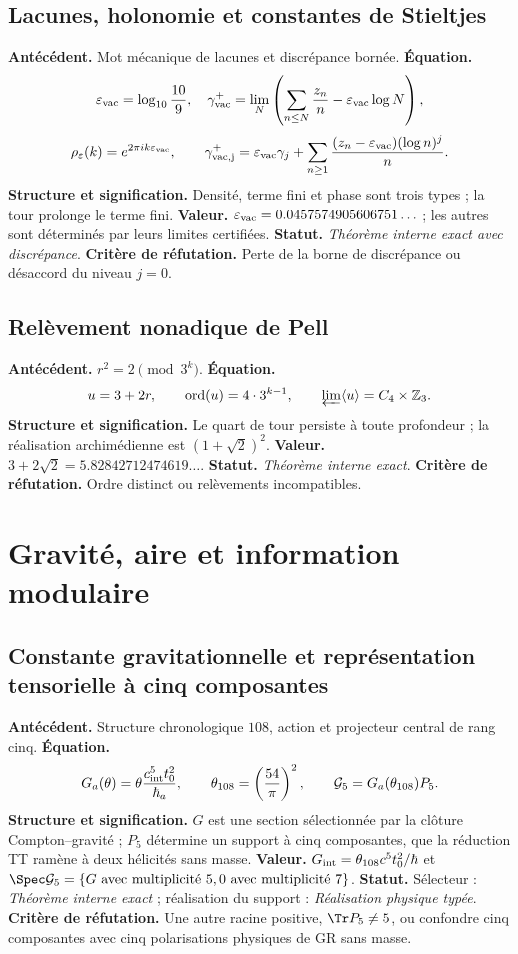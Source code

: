 \subsection*{Lacunes, holonomie et constantes de Stieltjes }
\textbf{Antécédent.} Mot mécanique de lacunes et discrépance bornée.
\textbf{Équation.}
\[
\varepsilon_{\rm vac}=\log_{10}\frac{10}{9},\quad
\gamma_{\rm vac}^+=\lim_N\left(\sum_{n\le N}\frac{z_n}{n}
-\varepsilon_{\rm vac}\log N\right),
\]
\[
\rho_\varepsilon(k)=e^{2\pi ik\varepsilon_{\rm vac}},\qquad
\gamma_{\rm vac,j}^+=\varepsilon_{\rm vac}\gamma_j+
\sum_{n\ge1}\frac{(z_n-\varepsilon_{\rm vac})(\log n)^j}{n}.
\]
\textbf{Structure et signification.} Densité, terme fini et phase sont trois
types ; la tour prolonge le terme fini. \textbf{Valeur.}
\(\varepsilon_{\rm vac}=0.0457574905606751\ldots\) ; les autres sont déterminés
par leurs limites certifiées. \textbf{Statut.} \emph{Théorème interne exact avec
discrépance}. \textbf{Critère de réfutation.} Perte de la borne de discrépance ou
désaccord du niveau \(j=0\).

\subsection*{Relèvement nonadique de Pell }
\textbf{Antécédent.} \(r^2=2\pmod{3^k}\). \textbf{Équation.}
\[
u=3+2r,\qquad \operatorname{ord}(u)=4\cdot3^{k-1},
\qquad \varprojlim\langle u\rangle=C_4\times\mathbb Z_3.
\]
\textbf{Structure et signification.} Le quart de tour persiste à toute
profondeur ; la réalisation archimédienne est \((1+\sqrt2)^2\).
\textbf{Valeur.} \(3+2\sqrt2=5.82842712474619\ldots\).
\textbf{Statut.} \emph{Théorème interne exact}. \textbf{Critère de réfutation.} Ordre distinct
ou relèvements incompatibles.

\section{Gravité, aire et information modulaire}

\subsection*{Constante gravitationnelle et représentation tensorielle à cinq composantes }
\textbf{Antécédent.} Structure chronologique \(108\), action et projecteur
central de rang
cinq. \textbf{Équation.}
\[
G_a(\theta)=\theta\frac{c_{\rm int}^5t_0^2}{\hbar_a},
\qquad \theta_{108}=\left(\frac{54}{\pi}\right)^2,
\qquad \mathcal G_5=G_a(\theta_{108})P_5.
\]
\textbf{Structure et signification.} \(G\) est une section sélectionnée par la
clôture Compton--gravité ; \(P_5\) détermine un support à cinq composantes,
que la réduction TT ramène à deux hélicités sans masse.
\textbf{Valeur.} \(G_{\rm int}=\theta_{108}c^5t_0^2/\hbar\) et
\(\Spec\mathcal G_5=\{G\text{ avec multiplicité }5,
0\text{ avec multiplicité }7\}\).
\textbf{Statut.} Sélecteur : \emph{Théorème interne exact} ; réalisation du support :
\emph{Réalisation physique typée}. \textbf{Critère de réfutation.} Une autre racine positive,
\(\Tr P_5\ne5\), ou confondre cinq composantes avec cinq polarisations
physiques de GR sans masse.

